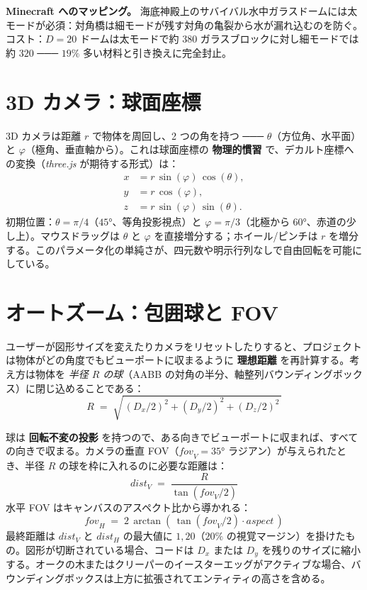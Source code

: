 \documentclass[12pt,a4paper]{scrartcl}
\newcommand{\acc}[1]{\textcolor{accent}{\textbf{#1}}}
\begin{document}
\begin{minec}
\textbf{Minecraft へのマッピング。} 海底神殿上のサバイバル水中ガラスドームには太モードが必須：対角橋は細モードが残す対角の亀裂から水が漏れ込むのを防ぐ。コスト：$D=20$ ドームは太モードで約 $380$ ガラスブロックに対し細モードでは約 $320$ ─── $19\%$ 多い材料と引き換えに完全封止。
\end{minec}

\section{3D カメラ：球面座標}

3D カメラは距離 $r$ で物体を周回し、2 つの角を持つ ─── $\theta$（方位角、水平面）と $\varphi$（極角、垂直軸から）。これは球面座標の \acc{物理的慣習} で、デカルト座標への変換（\emph{three.js} が期待する形式）は：
\[
\begin{aligned}
x &= r\,\sin(\varphi)\,\cos(\theta), \\
y &= r\,\cos(\varphi), \\
z &= r\,\sin(\varphi)\,\sin(\theta).
\end{aligned}
\]
初期位置：$\theta = \pi/4$（$45°$、等角投影視点）と $\varphi = \pi/3$（北極から $60°$、赤道の少し上）。マウスドラッグは $\theta$ と $\varphi$ を直接増分する；ホイール/ピンチは $r$ を増分する。このパラメータ化の単純さが、四元数や明示行列なしで自由回転を可能にしている。

\section{オートズーム：包囲球と FOV}

ユーザーが図形サイズを変えたりカメラをリセットしたりすると、プロジェクトは物体がどの角度でもビューポートに収まるように \acc{理想距離} を再計算する。考え方は物体を \emph{半径 $R$ の球}（AABB の対角の半分、軸整列バウンディングボックス）に閉じ込めることである：
\[
R \;=\; \sqrt{\,(D_x/2)^2 + (D_y/2)^2 + (D_z/2)^2\,}
\]

球は \acc{回転不変の投影} を持つので、ある向きでビューポートに収まれば、すべての向きで収まる。カメラの垂直 FOV（$\mathit{fov}_V = 35°$ ラジアン）が与えられたとき、半径 $R$ の球を枠に入れるのに必要な距離は：
\[
\mathit{dist}_V \;=\; \dfrac{R}{\tan(\mathit{fov}_V / 2)}
\]
水平 FOV はキャンバスのアスペクト比から導かれる：
\[
\mathit{fov}_H \;=\; 2\,\arctan\!\left(\,\tan(\mathit{fov}_V/2)\cdot \mathit{aspect}\,\right)
\]
最終距離は $\mathit{dist}_V$ と $\mathit{dist}_H$ の最大値に $1{,}20$（$20\%$ の視覚マージン）を掛けたもの。図形が切断されている場合、コードは $D_x$ または $D_y$ を残りのサイズに縮小する。オークの木またはクリーパーのイースターエッグがアクティブな場合、バウンディングボックスは上方に拡張されてエンティティの高さを含める。
\end{document}
